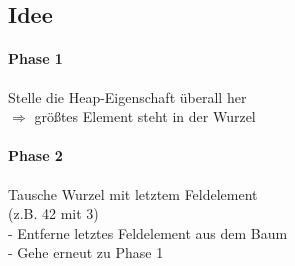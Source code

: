 \subsection{Idee}
\paragraph{Phase 1} Stelle die Heap-Eigenschaft überall her\\
$\Rightarrow$ größtes Element steht in der Wurzel
\paragraph{Phase 2} Tausche Wurzel mit letztem Feldelement\\
(z.B. 42 mit 3)\\
- Entferne letztes Feldelement aus dem Baum\\
- Gehe erneut zu Phase 1
